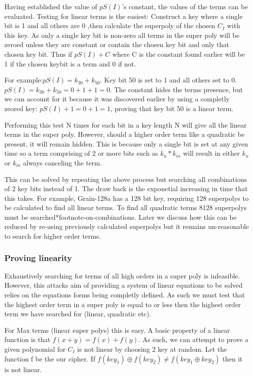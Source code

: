 \documentclass{report}
\begin{document}
Having established the value of $pS(I)$'s constant, the values of the terms can be evaluated. Testing for linear terms is the easiest: Construct a key where a single bit is 1 and all others are 0 ,then calculate the superpoly of the chosen $C_I$ with this key. As only a single key bit is non-zero all terms in the super poly will be zeroed unless they are constant or contain the chosen key bit and only that chosen key bit. Thus if $pS(I)+C$ where C is the constant found earlier will be 1 if the chosen keybit is a term and 0 if not.

For example:$pS(I)=k_{30}+k_{50}$. Key bit 50 is set to 1 and all others set to 0. $pS(I)=k_{30}+k_{50}=0+1+1=0$. The constant hides the terms presence, but we can account for it because it was discovered earlier by using a completly zeored key: $pS(I)+1=0+1=1$, proving that key bit 50 is a linear term.

Performing this test N times for each bit in a key length N will give all the linear terms in the super poly. However, should a higher order term like a quadratic be present, it will remain hidden. This is because only a single bit is set at any given time so a term comprising of 2 or more bits such as $k_n*k_m$ will result in either $k_n$ or $k_m$ always canceling the term.

This can be solved by repeating the above process but searching all combinations of 2 key bits instead of 1. The draw back is the exponetial increasing in time that this takes. For example, Grain-128a has a 128 bit key, requiring 128 superpolys to be calculated to find all linear terms. To find all quadratic terms 8128 superpolys must be searched*footnote-on-combinations. Later we discuss how this can be reduced by re-using previously calculated superpolys but it remains un-reasonable to search for higher order terms.
\subsubsection{Proving linearity}
Exhaustively searching for terms of all high orders in a super poly is infeasible. However, this attacks aim of providing a system of linear equations to be solved relies on the equations forms being completly defined. As such we must test that the highest order term in a super poly is equal to or less then the highest order term we have searched for (linear, quadratic etc).

For Max terms (linear super polys) this is easy. A basic property of a linear function is that $f(x+y)=f(x)+f(y)$.%
As such, we can attempt to prove a given polynomial for $C_I$ is not linear by choosing 2 key at random. Let the function f be the our cipher. If $f(key_1)\oplus f(key_2) \neq f(key_1 \oplus key_2)$ then it is not linear.
\end{document}
